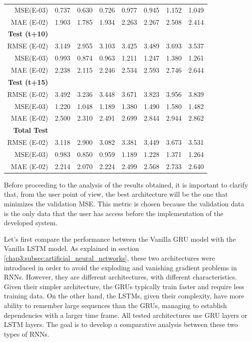 \begin{table}[htbp]
\begin{tabular}{r|c|cc|cccc}
    MSE(E-03) & 0.737 & 0.630 & 0.726 & 0.977 & 0.945 & 1.152 & 1.049 \\
    MAE (E-02) & 1.903 & 1.785 & 1.934 & 2.263 & 2.267 & 2.508 & 2.414 \\
    \textbf{Test (t+10)} &   &   &   &   &   &   &  \\
    RMSE (E-02) & 3.149 & 2.955 & 3.103 & 3.425 & 3.489 & 3.693 & 3.537 \\
    MSE(E-03) & 0.993 & 0.874 & 0.963 & 1.211 & 1.247 & 1.380 & 1.261 \\
    MAE (E-02) & 2.238 & 2.115 & 2.246 & 2.534 & 2.593 & 2.746 & 2.644 \\
    \textbf{Test (t+15)} &   &   &   &   &   &   &  \\
    RMSE (E-02) & 3.492 & 3.236 & 3.448 & 3.671 & 3.823 & 3.956 & 3.839 \\
    MSE(E-03) & 1.220 & 1.048 & 1.189 & 1.380 & 1.490 & 1.580 & 1.482 \\
    MAE (E-02) & 2.500 & 2.310 & 2.491 & 2.699 & 2.844 & 2.944 & 2.862 \\
    \midrule
    \textbf{Total Test} &   &   &   &   &   &   &  \\
    RMSE (E-02) & 3.118 & 2.900 & 3.082 & 3.381 & 3.449 & 3.673 & 3.531 \\
    MSE(E-03) & 0.983 & 0.850 & 0.959 & 1.189 & 1.228 & 1.371 & 1.264 \\
    MAE (E-02) & 2.214 & 2.070 & 2.224 & 2.499 & 2.568 & 2.733 & 2.640 \\
    \end{tabular}%
  \label{valres}%
\end{table}%


Before proceeding to the analysis of the results obtained, it is important to clarify that, from the user point of view, the best architecture will be the one that minimizes the validation \ac{MSE}. This metric is chosen because the validation data is the only data that the user has access before the implementation of the developed system.

Let's first compare the performance between the Vanilla \ac{GRU} model with the Vanilla \ac{LSTM} model. As explained in section \ref{chap3:subsec:artificial_neural_networks}, these two architectures were introduced in order to avoid the exploding and vanishing gradient problems in \ac{RNN}s. However, they are different architectures, with different characteristics. Given their simpler architecture, the \ac{GRU}s typically train faster and require less training data. On the other hand, the \ac{LSTM}s, given their complexity, have more ability to remember large sequences than the \ac{GRU}s, managing to establish dependencies with a larger time frame. All tested architectures use \ac{GRU} layers or \ac{LSTM} layers. The goal is to develop a comparative analysis between these two types of \ac{RNN}s.

